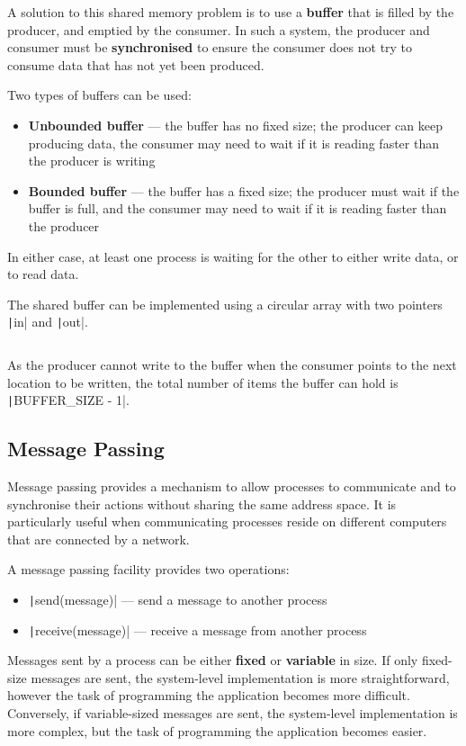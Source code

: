 \documentclass{article}
\begin{document}
A solution to this shared memory problem is to use a \textbf{buffer}
that is filled by the producer, and emptied by the consumer. In such a
system, the producer and consumer must be \textbf{synchronised} to
ensure the consumer does not try to consume data that has not yet been
produced.

Two types of buffers can be used:
\begin{itemize}
    \item \textbf{Unbounded buffer} --- the buffer has no fixed size;
          the producer can keep producing data, the consumer may need
          to wait if it is reading faster than the producer is writing
    \item \textbf{Bounded buffer} --- the buffer has a fixed size; the
          producer must wait if the buffer is full, and the consumer
          may need to wait if it is reading faster than the producer
\end{itemize}
In either case, at least one process is waiting for the other to either
write data, or to read data.

The shared buffer can be implemented using a circular array with two
pointers \texttt|in| and \texttt|out|.
\inputminted{c}{code/shared_memory.c} As the producer cannot write to
the buffer when the consumer points to the next location to be written,
the total number of items the buffer can hold is
\texttt|BUFFER_SIZE - 1|.
\subsection{Message Passing}
Message passing provides a mechanism to allow processes to communicate
and to synchronise their actions without sharing the same address
space. It is particularly useful when communicating processes reside on
different computers that are connected by a network.

A message passing facility provides two operations:
\begin{itemize}
    \item \texttt|send(message)| --- send a message to another
          process
    \item \texttt|receive(message)| --- receive a message from
          another process
\end{itemize}
Messages sent by a process can be either \textbf{fixed} or
\textbf{variable} in size. If only fixed-size messages are sent, the
system-level implementation is more straightforward, however the task
of programming the application becomes more difficult. Conversely, if
variable-sized messages are sent, the system-level implementation is
more complex, but the task of programming the application becomes
easier.
\end{document}
